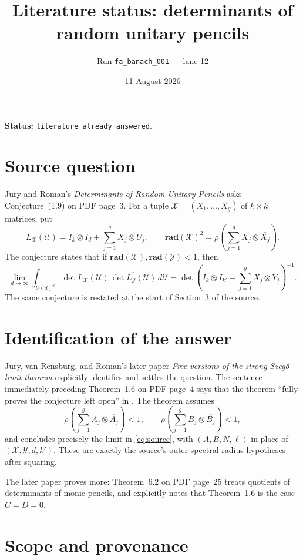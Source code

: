 \documentclass[11pt]{article}
\title{Literature status: determinants of random unitary pencils}
\author{Run \texttt{fa\_banach\_001} --- lane 12}
\date{11 August 2026}
\begin{document}
\maketitle

\textbf{Status:} \texttt{literature\_already\_answered}.

\section*{Source question}

Jury and Roman's \emph{Determinants of Random Unitary Pencils}
\cite{JR26} asks Conjecture~(1.9) on PDF page~3.  For a tuple
$\mathcal X=(X_1,\ldots,X_g)$ of $k\times k$ matrices, put
\[
 L_{\mathcal X}(\mathcal U)
 =I_k\otimes I_d+\sum_{j=1}^gX_j\otimes U_j,
 \qquad
 \mathbf{rad}(\mathcal X)^2
 =\rho\!\left(\sum_{j=1}^gX_j\otimes\overline{X_j}\right).
\]
The conjecture states that if
$\mathbf{rad}(\mathcal X),\mathbf{rad}(\mathcal Y)<1$, then
\begin{equation}\label{eq:source}
 \lim_{d\to\infty}\int_{U(d)^g}
 \det L_{\mathcal X}(\mathcal U)\,
 \overline{\det L_{\mathcal Y}(\mathcal U)}\,d\mathcal U
 =\det\!\left(
 I_k\otimes I_{k'}-\sum_{j=1}^gX_j\otimes\overline{Y_j}
 \right)^{-1}.
\end{equation}
The same conjecture is restated at the start of Section~3 of the source.

\section*{Identification of the answer}

Jury, van Rensburg, and Roman's later paper \emph{Free versions of the
strong Szeg\H{o} limit theorem} \cite{JvRR26} explicitly identifies and
settles the question.  The sentence immediately preceding Theorem~1.6 on PDF
page~4 says that the theorem ``fully proves the conjecture left open'' in
\cite{JR26}.  The theorem assumes
\[
 \rho\!\left(\sum_{j=1}^g A_j\otimes\overline{A_j}\right)<1,
 \qquad
 \rho\!\left(\sum_{j=1}^g B_j\otimes\overline{B_j}\right)<1,
\]
and concludes precisely the limit in \eqref{eq:source}, with
$(A,B,N,\ell)$ in place of $(\mathcal X,\mathcal Y,d,k')$.  These are exactly
the source's outer-spectral-radius hypotheses after squaring.

The later paper proves more: Theorem~6.2 on PDF page~25 treats quotients of
determinants of monic pencils, and explicitly notes that Theorem~1.6 is the
case $C=D=0$.

\section*{Scope and provenance}
\end{document}
